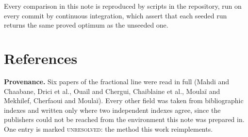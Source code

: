 \documentclass[11pt,a4paper]{article}
\begin{document}
\noindent
Every comparison in this note is reproduced by scripts in the repository, run
on every commit by continuous integration, which assert that each seeded run
returns the same proved optimum as the unseeded one.

\section*{References}

\noindent
\textbf{Provenance.}  Six papers of the fractional line were read in full
(Mahdi and Chaabane, Drici et al., Oua\"il and Chergui, Chaiblaine et al.,
Moula\"i and Mekhilef, Cherfaoui and Moula\"i).  Every other field was taken
from bibliographic indexes and written only where two independent indexes
agree, since the publishers could not be reached from the environment this
note was prepared in.  One entry is marked \textsc{unresolved}: the method
this work reimplements.



\end{document}
